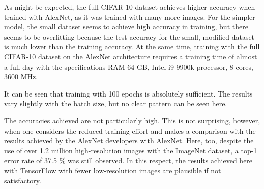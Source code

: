 As might be expected, the full CIFAR-10 dataset achieves higher accuracy when trained with AlexNet, as it was trained with many more images. For the simpler model, the small dataset seems to achieve high accuracy in training, but there seems to be overfitting because the test accuracy for the small, modified dataset is much lower than the training accuracy. At the same time, training with the full CIFAR-10 dataset on the AlexNet architecture requires a training time of almost a full day with the specifications RAM 64 GB, Intel i9 9900k processor, 8 cores, 3600 MHz.

It can be seen that training with 100 epochs is absolutely sufficient. The results vary slightly with the batch size, but no clear pattern can be seen here.

The accuracies achieved are not particularly high. This is not surprising, however, when one considers the reduced training effort and makes a comparison with the results achieved by the AlexNet developers with AlexNet. Here, too, despite the use of over 1.2 million high-resolution images with the ImageNet dataset, a top-1 error rate of 37.5 \% was still observed. In this respect, the results achieved here with TensorFlow with fewer low-resolution images are plausible if not satisfactory.

